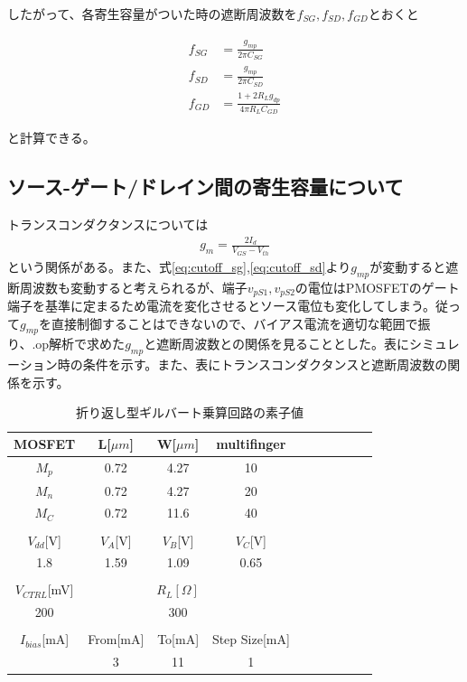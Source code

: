\documentclass[twocolumn]{jsarticle}
\begin{document}
したがって、各寄生容量がついた時の遮断周波数を$f_{SG},f_{SD},f_{GD}$とおくと

\begin{align}
    f_{SG} &= \frac{g_{mp}}{2\pi C_{SG}}    \label{eq:cutoff_sg}\\
    f_{SD} &= \frac{g_{mp}}{2\pi C_{SD}}    \label{eq:cutoff_sd}\\
    f_{GD} &= \frac{1+2R_{L}g_{dp}}{4\pi R_{L}C_{GD}}      \label{eq:cutoff_gd}
\end{align}

と計算できる。

\subsection{ソース-ゲート/ドレイン間の寄生容量について}
    トランスコンダクタンスについては
    \begin{align*}
        g_{m}=\frac{2I_{d}}{V_{GS}-V_{th}}
    \end{align*}
    という関係がある。また、式\eqref{eq:cutoff_sg},\eqref{eq:cutoff_sd}より$g_{mp}$が変動すると遮断周波数も変動すると考えられるが、端子$v_{pS1},v_{pS2}$の電位はPMOSFETのゲート端子を基準に定まるため電流を変化させるとソース電位も変化してしまう。従って$g_{mp}$を直接制御することはできないので、バイアス電流を適切な範囲で振り、.op解析で求めた$g_{mp}$と遮断周波数との関係を見ることとした。表にシミュレーション時の条件を示す。また、表にトランスコンダクタンスと遮断周波数の関係を示す。

    \begin{table}[h]
        \caption{折り返し型ギルバート乗算回路の素子値}
        \label{table:sim_s_g/d}
        \centering
        \begin{tabular}{cccccccccc}
            MOSFET & L[$\mu m$] & W[$\mu m$] & multifinger\\
            \hline \hline
            $M_{p}$ & 0.72 & 4.27 & 10 \\
            $M_{n}$ & 0.72 & 4.27 & 20 \\
            $M_{C}$ & 0.72 & 11.6 & 40 \\
            &&&\\
            $V_{dd}$[V] & $V_{A}$[V] & $V_{B}$[V] & $V_{C}$[V]\\
            \hline\hline
            1.8 & 1.59 & 1.09 & 0.65 \\
            &&&\\
             $V_{CTRL}$[mV] & & $R_{L}[\Omega]$ & \\
            \hline\hline
            200 & & 300 &\\
            &&&\\
            $I_{bias}$[mA] & From[mA] & To[mA] & Step Size[mA]\\
            \hline\hline
            & 3 & 11 & 1
        \end{tabular}
    \end{table}
\end{document}
